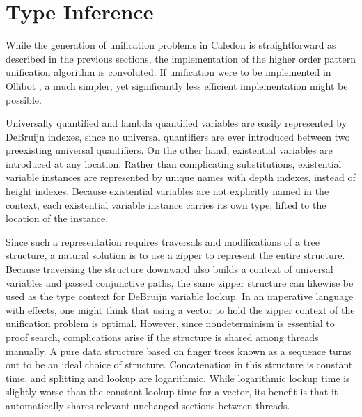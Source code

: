 \section{Type Inference}

While the generation of unification problems in Caledon is straightforward as described in the previous
sections, the implementation of the higher order pattern unification algorithm
is convoluted. If unification were to be implemented in Ollibot \citep{pfenning2009substructural}, a much simpler, 
yet significantly less efficient implementation might be possible.

Universally quantified and lambda quantified variables 
are easily represented by DeBruijn indexes, since no universal quantifiers are ever
introduced between two preexisting universal quantifiers. On the other hand, existential
variables are introduced at any location. Rather than complicating substitutions,
existential variable instances are represented by unique names with depth indexes, instead of height indexes.
Because existential variables are not explicitly named in the context, each existential variable instance carries its
own type, lifted to the location of the instance.

Since such a representation requires traversals and modifications of a tree structure,
a natural solution is to use a zipper to represent the entire structure. Because traversing the structure
downward also builds a context of universal variables and passed conjunctive
paths, the same zipper structure can likewise be used as the type context for DeBruijn variable
lookup. In an imperative language with effects, one might think that using
a vector to hold the zipper context of the unification problem is optimal. However,
since nondeterminism is essential to proof search, complications
arise if the structure is shared among threads manually.  A pure data structure based on
finger trees \citep{hinze2006finger} known as a sequence turns out to be an 
ideal choice of structure. Concatenation in this structure is constant time, and splitting and lookup are logarithmic.
While logarithmic lookup time is slightly worse than the constant lookup time for a vector, its benefit is
that it automatically shares relevant unchanged sections between threads.


    
